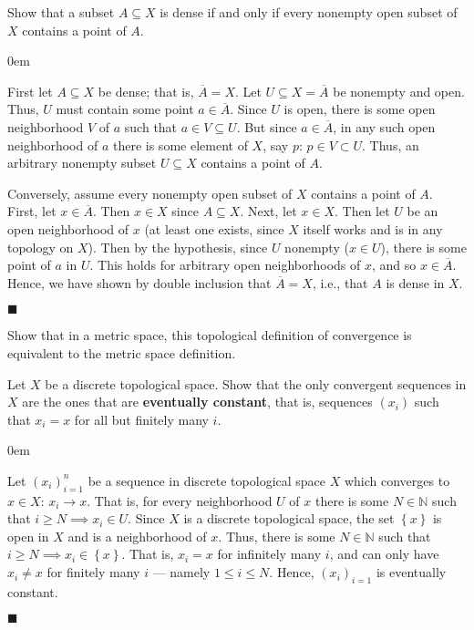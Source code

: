 \documentclass[12pt]{article}
\renewcommand{\qed}{\hfill$\blacksquare$}
\renewenvironment{proof}{\begin{addmargin}[1em]{0em}\begin{newproof}}{\end{newproof}\end{addmargin}\qed}
\newenvironment{exercise}[2][Exercise]{\begin{trivlist}
\item[\hskip \labelsep {\bfseries #1}\hskip \labelsep {\bfseries #2.}]}{\end{trivlist}}
\begin{document}
\begin{exercise}{2.11}
Show that a subset $A\subseteq X$ is dense if and only if every nonempty open subset of $X$ contains a point of $A$.
\end{exercise}
\begin{proof}
First let $A \subseteq X$ be dense; that is, $\overline{A}=X$. Let $U \subseteq X=\overline{A}$ be nonempty and open. Thus, $U$ must contain some point $a\in \overline{A}$. Since $U$ is open, there is some open neighborhood $V$ of $a$ such that $a \in V \subseteq U$. But since $a\in \overline{A}$, in any such open neighborhood of $a$ there is some element of $X$, say $p$: $p \in V \subset U$. Thus, an arbitrary nonempty subset $U \subseteq X$ contains a point of $A$.

Conversely, assume every nonempty open subset of $X$ contains a point of $A$. First, let $x \in \overline{A}$. Then $x \in X$ since $A\subseteq X$. Next, let $x\in X$. Then let $U$ be an open neighborhood of $x$ (at least one exists, since $X$ itself works and is in any topology on $X$). Then by the hypothesis, since $U$ nonempty ($x\in U$), there is some point of $a$ in $U$. This holds for arbitrary open neighborhoods of $x$, and so $x\in \overline{A}$. Hence, we have shown by double inclusion that $\overline{A}=X$, i.e., that $A$ is dense in $X$.
\end{proof}






\begin{exercise}{2.12}
Show that in a metric space, this topological definition of convergence is equivalent to the metric space definition.
\end{exercise}


\begin{exercise}{2.13}
Let $X$ be a discrete topological space. Show that the only convergent sequences in $X$ are the ones that are \textbf{eventually constant}, that is, sequences $\left(x_i\right)$ such that $x_i=x$ for all but finitely many $i$.
\end{exercise}
\begin{proof}
Let $\left(x_i\right)_{i=1}^n$ be a sequence in discrete topological space $X$ which converges to $x\in X$: $x_i \rightarrow x$. That is, for every neighborhood $U$ of $x$ there is some $N \in \mathbb{N}$ such that $i\geq N \implies x_i \in U$. Since $X$ is a discrete topological space, the set $\left\{x\right\}$ is open in $X$ and is a neighborhood of $x$. Thus, there is some $N \in \mathbb{N}$ such that $i\geq N \implies x_i \in \left\{x\right\}$. That is, $x_i = x$ for infinitely many $i$, and can only have $x_i \neq x$ for finitely many $i$ --- namely $1\leq i \leq N$. Hence, $\left(x_i\right)_{i=1}$ is eventually constant.
\end{proof}
\end{document}
